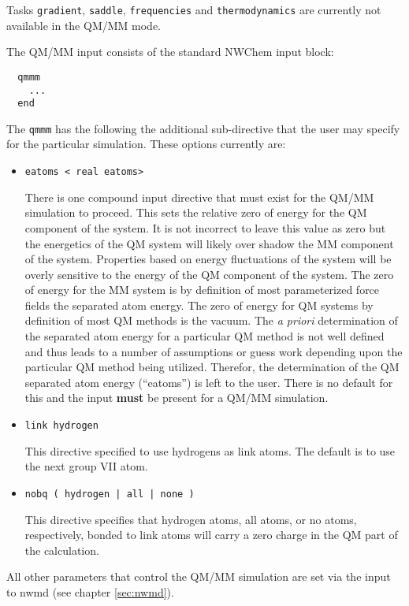 Tasks \verb+gradient+, \verb+saddle+, \verb+frequencies+ and
\verb+thermodynamics+ are currently not available in the QM/MM mode.  


The QM/MM input consists of the standard NWChem input block:
\begin{verbatim}
  qmmm
    ...
  end
\end{verbatim}

The \verb+qmmm+ has the following the additional sub-directive that the user
may specify for the particular simulation.  These options currently are:

\begin{itemize}

\item
\begin{verbatim}
eatoms < real eatoms>
\end{verbatim}

There is one compound input directive that must exist for the QM/MM
simulation to proceed.  This sets the relative zero of energy for the
QM component of the system.  It is not incorrect to leave this value as
zero but the energetics of the QM system will likely over shadow the
MM component of the system.  Properties based on energy fluctuations
of the system will be overly sensitive to the energy of the QM
component of the system.  The zero of energy for the MM system is by
definition of most parameterized force fields the separated atom
energy.  The zero of energy for QM systems by definition of most QM
methods is the vacuum.  The {\it a priori} determination of the
separated atom energy for a particular QM method is not well defined
and thus leads to a number of assumptions or guess work depending upon
the particular QM method being utilized.  Therefor, the determination
of the QM separated atom energy (``eatoms'') is left to the user.
There is no default for this and the input {\bf must} be present for a
QM/MM simulation.  

\item
\begin{verbatim}
link hydrogen
\end{verbatim}

This directive specified to use hydrogens as link atoms. The default
is to use the next group VII atom.  

\item
\begin{verbatim}
nobq ( hydrogen | all | none )
\end{verbatim}

This directive specifies that hydrogen atoms, all atoms, or no atoms,
respectively, bonded to link atoms will carry a zero charge in the
QM part of the calculation.

\end{itemize}
All other parameters that control the QM/MM simulation are set via the
input to nwmd (see chapter \ref{sec:nwmd}).

